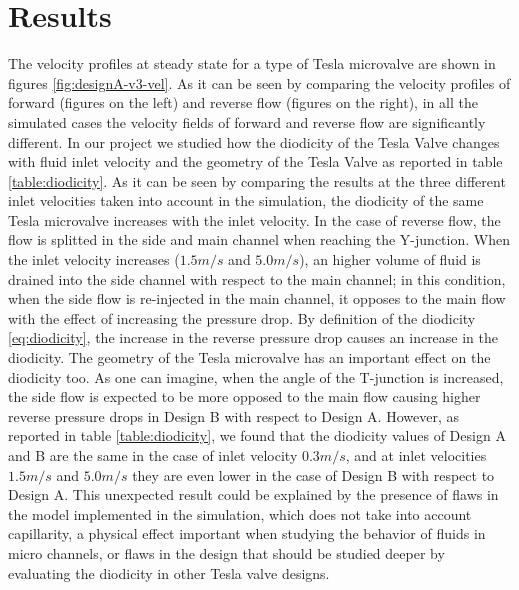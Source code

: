 \documentclass[11pt, letterpaper]{amsart}
\begin{document}
\section{Results}
The velocity profiles at steady state for a type of Tesla microvalve are shown in figures \ref{fig:designA-v3-vel}.
\newline
As it can be seen by comparing the velocity profiles of forward (figures on the left) and reverse flow (figures on the right), in all the simulated cases the velocity fields of forward and reverse flow are significantly different.
\newline
In our project we studied how the diodicity of the Tesla Valve changes with fluid inlet velocity and the geometry of the Tesla Valve as reported in table \ref{table:diodicity}.
\newline
As it can be seen by comparing the results at the three different inlet velocities taken into account in the simulation, the diodicity of the same Tesla microvalve increases with the inlet velocity. In the case of reverse flow, the flow is splitted in the side and main channel when reaching the Y-junction. 
When the inlet velocity increases ($1.5 m/s$ and $5.0 m/s$), an higher volume of fluid is drained into the side channel with respect to the main channel; in this condition, when the side flow is re-injected in the main channel, it opposes to the main flow with the effect of increasing the pressure drop. By definition of the diodicity \ref{eq:diodicity}, the increase in the reverse pressure drop causes an increase in the diodicity.
\newline
The geometry of the Tesla microvalve has an important effect on the diodicity too. As one can imagine, when the angle of the T-junction is increased, the side flow is expected to be more opposed to the main flow causing higher reverse pressure drops in Design B with respect to Design A. However, as reported in table \ref{table:diodicity}, we found that the diodicity values of Design A and B are the same in the case of inlet velocity $0.3 m/s$, and at inlet velocities $1.5 m/s$ and $5.0 m/s$ they are even lower in the case of Design B with respect to Design A. This unexpected result could be explained by the presence of flaws in the model implemented in the simulation, which does not take into account capillarity, a physical effect important when studying the behavior of fluids in micro channels, or flaws in the design that should be studied deeper by evaluating the diodicity in other Tesla valve designs.
\end{document}
